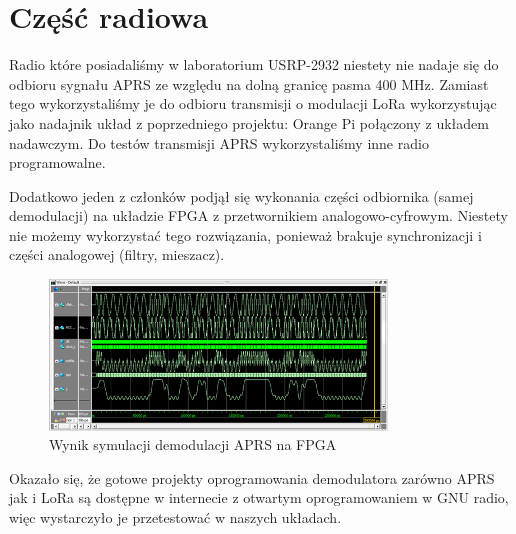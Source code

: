 \section{Część radiowa}


Radio które posiadaliśmy w laboratorium USRP-2932 niestety nie nadaje się do odbioru sygnału APRS ze względu na dolną granicę pasma 400 MHz. Zamiast tego wykorzystaliśmy je do odbioru transmisji o modulacji LoRa wykorzystując jako nadajnik układ z poprzedniego projektu: Orange Pi połączony z układem nadawczym. Do testów transmisji APRS wykorzystaliśmy inne radio programowalne.

Dodatkowo jeden z członków podjął się wykonania części odbiornika (samej demodulacji) na układzie FPGA z przetwornikiem analogowo-cyfrowym. Niestety nie możemy wykorzystać tego rozwiązania, ponieważ brakuje synchronizacji i części analogowej (filtry, mieszacz).

\begin{figure}[!htbp]
 \includegraphics[width=0.8\textwidth]{symulacja}
 \centering
 \caption{Wynik symulacji demodulacji APRS na FPGA}
\end{figure}

Okazało się, że gotowe projekty oprogramowania demodulatora zarówno APRS jak i LoRa są dostępne w internecie z otwartym oprogramowaniem w GNU radio, więc wystarczyło je przetestować w naszych układach.
